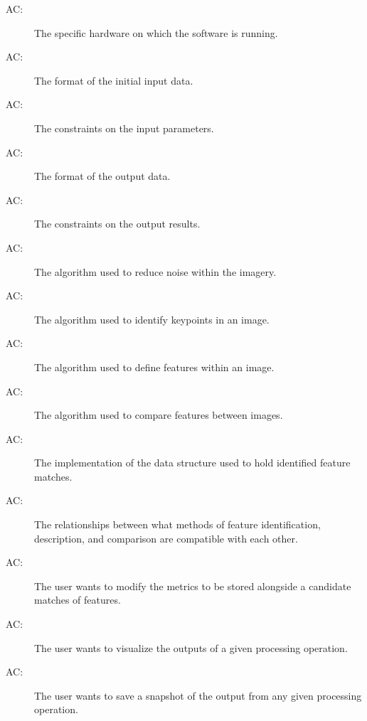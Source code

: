 \documentclass[12pt, titlepage]{article}
\newcounter{acnum}
\newcommand{\actheacnum}{AC\theacnum}
\begin{document}
\begin{description}
\item[ \actheacnum \label{acHardware}:] The specific
  hardware on which the software is running.
\item[ \actheacnum \label{acInput}:] The format of the
  initial input data.
\item[ \actheacnum \label{acInConstrain}:] The constraints 
on the input parameters.
\item[ \actheacnum \label{acOutput}:] The format of the 
output data.
\item[ \actheacnum \label{acOutConstrain}:] The constraints 
on the output results.
\item[ \actheacnum \label{acNoise}:] The algorithm used to 
reduce noise within the imagery.
\item[ \actheacnum \label{acKP}:] The algorithm used to 
identify keypoints in an image.
\item[ \actheacnum \label{acFD}:] The algorithm used to 
define features within an image.
\item[ \actheacnum \label{acFM}:] The algorithm used to 
compare features between images.
\item[ \actheacnum \label{acMatches}:] The implementation 
of the data structure used to hold identified feature matches.
\item[ \actheacnum \label{acRelation}:] The relationships 
between what methods of feature identification, description, and comparison are 
compatible with each other.
\item[ \actheacnum \label{acMetrics}:] The user wants to 
modify the metrics to be stored alongside a candidate matches of features.
\item[ \actheacnum \label{acVisualize}:] The user wants 
to visualize the outputs of a given processing operation.
\item[ \actheacnum \label{acSaveImage}:] The user wants 
to save a snapshot of the output from any given processing operation.


\end{description}

\end{document}
